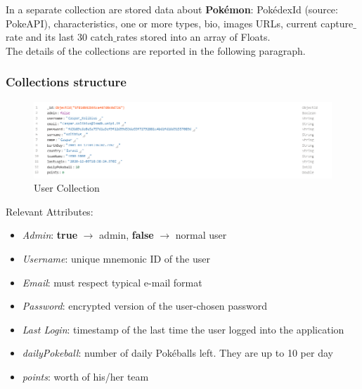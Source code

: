 In a separate collection are stored data about \textbf{Pokémon}: PokédexId (source: PokeAPI), characteristics, one or more types, bio, images URLs, current capture$\_$rate and its last 30 catch$\_$rates stored into an array of Floats.\\

The details of the collections are reported in the following paragraph.

\subsubsection{Collections structure}
\begin{figure}[H]
	\centering
	\includegraphics[width=\textwidth]{img/user_collection.png}
	\caption{User Collection}
\end{figure}
Relevant Attributes:
\begin{itemize}
	\item \textit{Admin}: \textbf{true} $\rightarrow$ admin, \textbf{false} $\rightarrow$ normal user
	\item \textit{Username}: unique mnemonic ID of the user
	\item \textit{Email}: must respect typical e-mail format
	\item \textit{Password}: encrypted version of the user-chosen password
	\item \textit{Last Login}: timestamp of the last time the user logged into the application
	\item \textit{dailyPokeball}: number of daily Pokéballs left. They are up to 10 per day
	\item \textit{points}: worth of his/her team
\end{itemize}

